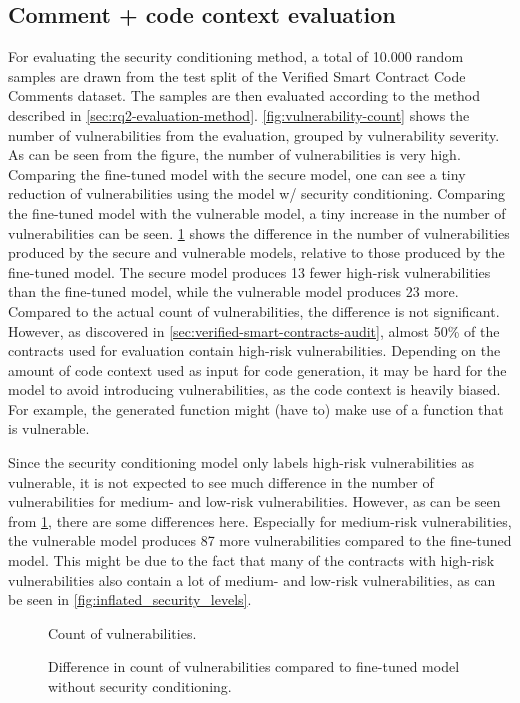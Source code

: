 \subsection{Comment + code context evaluation}
\label{sec:eval-rq2-comment-pluss-code-context}
For evaluating the security conditioning method, a total of 10.000 random samples are drawn from the test split of the Verified Smart Contract Code Comments dataset. The samples are then evaluated according to the method described in \cref{sec:rq2-evaluation-method}.
\cref{fig:vulnerability-count} shows the number of vulnerabilities from the evaluation, grouped by vulnerability severity. As can be seen from the figure, the number of vulnerabilities is very high. Comparing the fine-tuned model with the secure model, one can see a tiny reduction of vulnerabilities using the model w/ security conditioning. Comparing the fine-tuned model with the vulnerable model, a tiny increase in the number of vulnerabilities can be seen. \cref{fig:vulnerability-count-diff} shows the difference in the number of vulnerabilities produced by the secure and vulnerable models, relative to those produced by the fine-tuned model. The secure model produces 13 fewer high-risk vulnerabilities than the fine-tuned model, while the vulnerable model produces 23 more. Compared to the actual count of vulnerabilities, the difference is not significant. However, as discovered in \cref{sec:verified-smart-contracts-audit}, almost 50\% of the contracts used for evaluation contain high-risk vulnerabilities. Depending on the amount of code context used as input for code generation, it may be hard for the model to avoid introducing vulnerabilities, as the code context is heavily biased. For example, the generated function might (have to) make use of a function that is vulnerable.

Since the security conditioning model only labels high-risk vulnerabilities as vulnerable, it is not expected to see much difference in the number of vulnerabilities for medium- and low-risk vulnerabilities. However, as can be seen from \cref{fig:vulnerability-count-diff}, there are some differences here. Especially for medium-risk vulnerabilities, the vulnerable model produces 87 more vulnerabilities compared to the fine-tuned model. This might be due to the fact that many of the contracts with high-risk vulnerabilities also contain a lot of medium- and low-risk vulnerabilities, as can be seen in \cref{fig:inflated_security_levels}. 

\begin{figure}[htp]
    \centering
    
    \caption{Count of vulnerabilities.}
    \label{fig:vulnerability-count}
    \vspace*{\floatsep}%
    
    \caption{Difference in count of vulnerabilities compared to fine-tuned model without security conditioning.}
    \label{fig:vulnerability-count-diff}
\end{figure}


